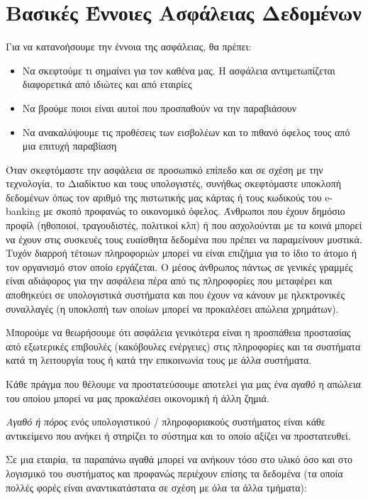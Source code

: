 %
%
\section{Βασικές Έννοιες Ασφάλειας Δεδομένων}

Για να κατανοήσουμε την έννοια της ασφάλειας, θα πρέπει:

\begin{itemize}
\item Να σκεφτούμε τι σημαίνει για τον καθένα μας. Η ασφάλεια αντιμετωπίζεται διαφορετικά από ιδιώτες και από εταιρίες
\item Να βρούμε ποιοι είναι αυτοί που προσπαθούν να την παραβιάσουν
\item Να ανακαλύψουμε τις προθέσεις των εισβολέων και το πιθανό όφελος τους από μια επιτυχή παραβίαση
\end{itemize}

Όταν σκεφτόμαστε την ασφάλεια σε προσωπικό επίπεδο και σε σχέση με την τεχνολογία, το Διαδίκτυο και τους υπολογιστές, συνήθως σκεφτόμαστε υποκλοπή δεδομένων όπως τον αριθμό της πιστωτικής μας κάρτας ή τους κωδικούς του e-banking με σκοπό προφανώς το οικονομικό όφελος. Άνθρωποι που έχουν δημόσιο προφίλ (ηθοποιοί, τραγουδιστές, πολιτικοί κλπ) ή που ασχολούνται με τα κοινά μπορεί να έχουν στις συσκευές τους ευαίσθητα δεδομένα που πρέπει να παραμείνουν μυστικά. Τυχόν διαρροή τέτοιων πληροφοριών μπορεί να είναι επιζήμια για το ίδιο το άτομο ή τον οργανισμό στον οποίο εργάζεται. Ο μέσος άνθρωπος πάντως σε γενικές γραμμές είναι αδιάφορος για την ασφάλεια πέρα από τις πληροφορίες που μεταφέρει και αποθηκεύει σε υπολογιστικά συστήματα και που έχουν να κάνουν με ηλεκτρονικές συναλλαγές (η υποκλοπή των οποίων μπορεί να προκαλέσει απώλεια χρημάτων).

Μπορούμε να θεωρήσουμε ότι ασφάλεια γενικότερα είναι η προσπάθεια προστασίας από εξωτερικές επιβουλές (κακόβουλες ενέργειες) στις πληροφορίες και τα συστήματα κατά τη λειτουργία τους ή κατά την επικοινωνία τους με άλλα συστήματα. 

Κάθε πράγμα που θέλουμε να προστατεύσουμε αποτελεί για μας ένα \emph{αγαθό} η απώλεια του οποίου μπορεί να μας προκαλέσει οικονομική ή άλλη ζημιά. 

\emph{Αγαθό ή πόρος} ενός υπολογιστικού / πληροφοριακούς συστήματος είναι κάθε αντικείμενο που ανήκει ή στηρίζει το σύστημα και το οποίο αξίζει να προστατευθεί.

Σε μια εταιρία, τα παραπάνω αγαθά μπορεί να ανήκουν τόσο στο υλικό όσο και στο λογισμικό του συστήματος και προφανώς περιέχουν επίσης τα δεδομένα (τα οποία πολλές φορές είναι αναντικατάστατα σε σχέση με όλα τα άλλα τμήματα):

